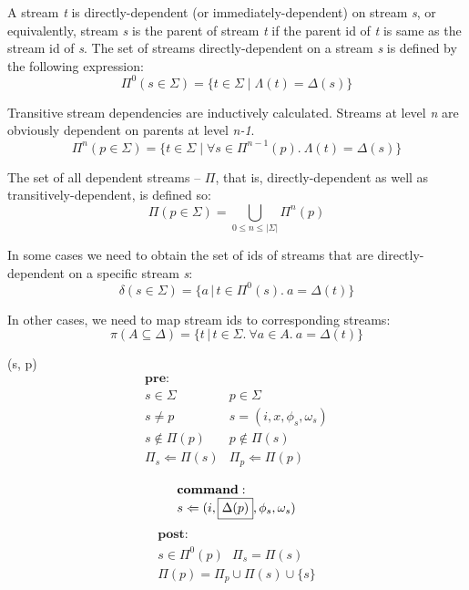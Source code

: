 \documentclass[10pt]{article}
\begin{document}
A stream \emph{t} is directly-dependent (or immediately-dependent) on stream \emph{s}, or equivalently, stream \emph{s} is the parent of stream \emph{t} if the parent id of \emph{t} is same as the stream id of \emph{s}. The set of streams directly-dependent on a stream \emph{s} is defined by the following expression: 
\[
    \Pi^0(s \in \Sigma) = \{ t \in \Sigma \; | \; \Lambda(t) = \Delta(s)  \}
\]

Transitive stream dependencies are inductively calculated. Streams at level \emph{n} are obviously dependent on parents at level \emph{n-1}.
\[
    \Pi^n(p \in \Sigma) = \{ t \in \Sigma \; | \; \forall s \in \Pi^{n-1}(p). \ \Lambda(t) = \Delta(s)  \}
\]

The set of all dependent streams -- $\Pi$, that is, directly-dependent as well as transitively-dependent, is defined so:
\[
     \Pi(p \in \Sigma) = \bigcup_{0 \leq n \leq |\Sigma|}\Pi^n(p)
\]

In some cases we need to obtain the set of ids of streams that are directly-dependent on a specific stream \emph{s}:
\[
    \delta(s \in \Sigma) = \{ a \,|\, t \in \Pi^0(s). \ a = \Delta(t) \}
\]

In other cases, we need to map stream ids to corresponding streams:
\[
    \pi(A \subseteq \Delta) = \{ t \,|\, t \in \Sigma. \ \forall a \in A. \ a = \Delta(t) \}
\]

(s, p)\\
\[
\begin{array}{ll}
\mathbf{pre}:&\\
  s \in \Sigma & p \in \Sigma\\
  s \neq p & s = (i, x, \phi_s, \omega_s)\\
  s \notin \Pi(p)  & p \notin \Pi(s)\\
  \Pi_s \Leftarrow \Pi(s) & \Pi_p \Leftarrow \Pi(p)\\
\end{array}
\]
\[
\begin{array}{l}
\mathbf{command}:\\
  s \Leftarrow (i, \fbox{$\Delta(p)$}, \phi_{s}, \omega_{s})\\
\end{array}
\]
\[
\begin{array}{l}
\mathbf{post}:\\
  s \in \Pi^0(p) \ \ \ \Pi_s = \Pi(s)\\
  \Pi(p) = \Pi_p \cup \Pi(s) \cup \{s\}\\
\end{array}
\]
\end{document}
